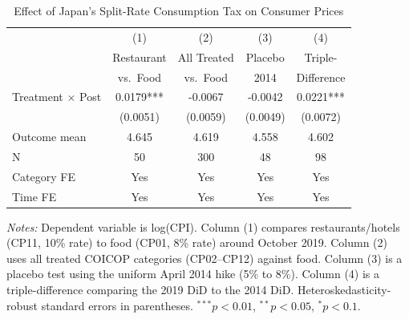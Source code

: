 \begin{table}[htbp]
\centering
\caption{Effect of Japan's Split-Rate Consumption Tax on Consumer Prices}
\label{tab:main}
\begin{tabular}{lcccc}
\hline\hline
 & (1) & (2) & (3) & (4) \\
 & Restaurant & All Treated & Placebo & Triple- \\
 & vs.\ Food & vs.\ Food & 2014 & Difference \\
\hline
Treatment $\times$ Post & 0.0179*** & -0.0067 & -0.0042 & 0.0221*** \\
 & (0.0051) & (0.0059) & (0.0049) & (0.0072) \\
\addlinespace
Outcome mean & 4.645 & 4.619 & 4.558 & 4.602 \\
N & 50 & 300 & 48 & 98 \\
Category FE & Yes & Yes & Yes & Yes \\
Time FE & Yes & Yes & Yes & Yes \\
\hline\hline
\end{tabular}
\begin{tablenotes}[flushleft]
\small
\item \textit{Notes:} Dependent variable is log(CPI). Column (1) compares restaurants/hotels (CP11, 10\% rate) to food (CP01, 8\% rate) around October 2019. Column (2) uses all treated COICOP categories (CP02--CP12) against food. Column (3) is a placebo test using the uniform April 2014 hike (5\% to 8\%). Column (4) is a triple-difference comparing the 2019 DiD to the 2014 DiD. Heteroskedasticity-robust standard errors in parentheses. $^{***}p<0.01$, $^{**}p<0.05$, $^{*}p<0.1$.
\end{tablenotes}
\end{table}
